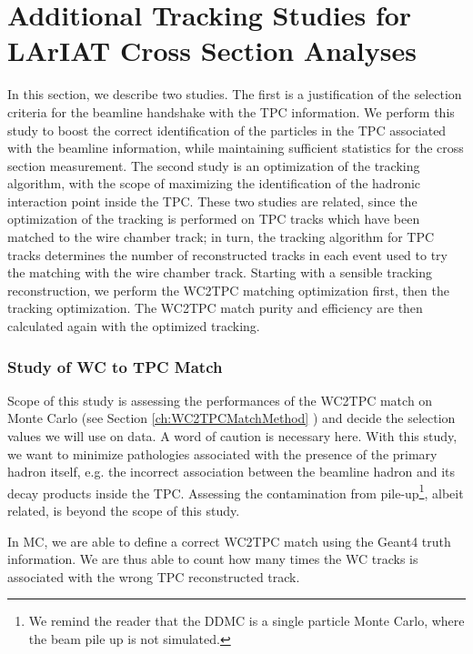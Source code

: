 \chapter{Additional Tracking Studies for LArIAT Cross Section Analyses}\label{ch:AppendixTrack}
In this section, we describe two studies. The first is a justification of the selection criteria for the beamline handshake with the TPC information.  We perform this study to boost  the correct identification of the particles in the TPC associated with the beamline information, while maintaining sufficient statistics for the cross section measurement.  The second study is an optimization of the tracking algorithm, with the scope of maximizing the identification of the hadronic interaction point inside the TPC.  These two studies are related, since the optimization of the tracking is performed on TPC tracks which have been matched to the wire chamber track; in turn, the tracking algorithm for TPC tracks determines the number of reconstructed tracks in each event used to try the matching with the wire chamber track. Starting with a sensible tracking reconstruction, we perform the WC2TPC matching optimization first, then the tracking optimization. The WC2TPC match purity and efficiency  are then calculated again with the optimized tracking.


\subsection{Study of WC to TPC Match}



Scope of this study is assessing the performances of the WC2TPC match on Monte Carlo (see Section \ref{ch:WC2TPCMatchMethod} ) and decide the selection values we will use on data. A word of caution is necessary here. With this study, we want to minimize pathologies associated with the presence of the primary hadron itself, e.g. the incorrect association between the beamline hadron and its decay products inside the TPC.  Assessing the contamination from pile-up\footnote{We remind the reader that the DDMC is a single particle Monte Carlo, where the beam pile up is not simulated.}, albeit related, is beyond the scope of this study.

In MC, we are able to define a correct WC2TPC match using the Geant4 truth information. We are thus able to count how many times the WC tracks is associated with the wrong TPC reconstructed track. 

